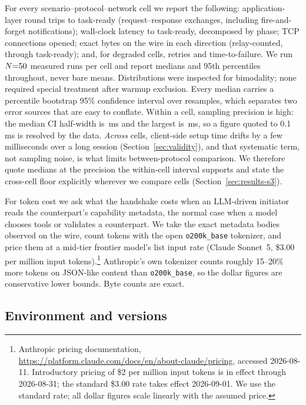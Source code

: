 \documentclass[10pt]{article}
\begin{document}
For every scenario--protocol--network cell we report the following:
application-layer round trips to task-ready (request--response exchanges,
including fire-and-forget notifications); wall-clock latency to
task-ready, decomposed by phase; TCP connections opened; exact bytes on
the wire in each direction (relay-counted, through task-ready); and, for
degraded cells, retries and time-to-failure. We run $N{=}50$ measured
runs per cell and report medians and 95th percentiles throughout, never
bare means. Distributions were inspected for bimodality; none required
special treatment after warmup exclusion. Every median carries a
percentile bootstrap 95\% confidence interval over \CiIters{} resamples,
which separates two error sources that are easy to conflate. Within a
cell, sampling precision is high: the median CI half-width is
\CiMedHalfWidth{}\,ms and the largest is \CiMaxHalfWidth{}\,ms, so a
figure quoted to 0.1\,ms is resolved by the data. \emph{Across} cells,
client-side setup time drifts by a few milliseconds over a long session
(Section~\ref{sec:validity}), and that systematic term, not sampling
noise, is what limits between-protocol comparison. We therefore quote
medians at the precision the within-cell interval supports and state the
cross-cell floor explicitly wherever we compare cells
(Section~\ref{sec:results-s3}).

For token cost we ask what the handshake costs when an LLM-driven
initiator reads the counterpart's capability metadata, the normal case
when a model chooses tools or validates a counterpart. We take the exact
metadata bodies observed on the wire, count tokens with the open
\texttt{o200k\_base} tokenizer, and price them at a mid-tier frontier
model's list input rate (Claude Sonnet~5, \$3.00 per million input
tokens).\footnote{Anthropic pricing documentation,
\url{https://platform.claude.com/docs/en/about-claude/pricing}, accessed
2026-08-11. Introductory pricing of \$2 per million input tokens is in
effect through 2026-08-31; the standard \$3.00 rate takes effect
2026-09-01. We use the standard rate; all dollar figures scale linearly
with the assumed price.} Anthropic's own tokenizer counts roughly
15--20\% more tokens on JSON-like content than \texttt{o200k\_base}, so
the dollar figures are conservative lower bounds. Byte counts are exact.

\subsection{Environment and versions}
\end{document}
